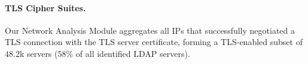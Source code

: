 





\paragraph{TLS Cipher Suites.}


Our Network Analysis Module aggregates all IPs that successfully negotiated a TLS connection with the TLS server certificate, forming a TLS-enabled subset of 48.2k servers (58\% of all identified LDAP servers).



